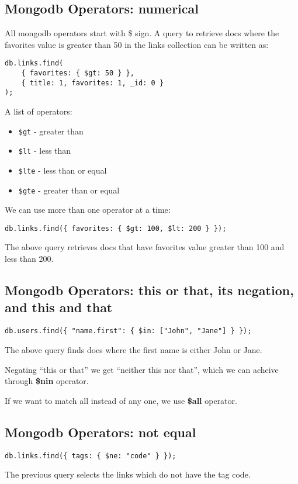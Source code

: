 \documentclass[a4paper, 12pt]{article}
\begin{document}
\subsection{Mongodb Operators: numerical}
All mongodb operators start with \$ sign.
A query to retrieve docs where the favorites value is greater than 50 in the links collection can be written as:
\begin{verbatim}
db.links.find(
    { favorites: { $gt: 50 } },
    { title: 1, favorites: 1, _id: 0 }
);
\end{verbatim}
A list of operators:
\begin{itemize}
    \item \verb|$gt| - greater than     
    \item \verb|$lt| - less than        
    \item \verb|$lte| - less than or equal
    \item \verb|$gte| - greater than or equal
\end{itemize}

We can use more than one operator at a time:
\begin{verbatim}
db.links.find({ favorites: { $gt: 100, $lt: 200 } });
\end{verbatim}
The above query retrieves docs that have favorites value greater than 100 and less than 200.
\subsection{Mongodb Operators: this or that, its negation, and this and that}
\begin{verbatim}
db.users.find({ "name.first": { $in: ["John", "Jane"] } });
\end{verbatim}
The above query finds docs where the first name is either John or Jane.

Negating ``this or that'' we get ``neither this nor that'', which we can acheive through \textbf{\$nin} operator.

If we want to match all instead of any one, we use \textbf{\$all} operator.
\subsection{Mongodb Operators: not equal}
\begin{verbatim}
db.links.find({ tags: { $ne: "code" } });
\end{verbatim}
The previous query selects the links which do not have the tag code.
\end{document}
